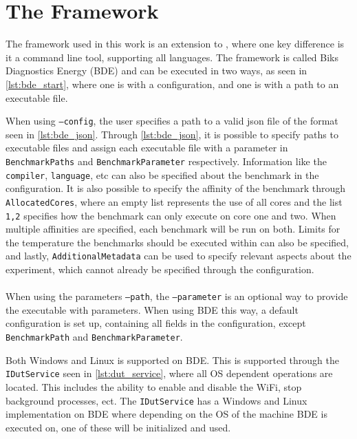 \section{The Framework}\label{app:framework}

The framework used in this work is an extension to \cite{biksbois}, where one key difference is it a command line tool, supporting all languages. The framework is called Biks Diagnostics Energy (BDE) and can be executed in two ways, as seen in \cref{lst:bde_start}, where one is with a configuration, and one is with a path to an executable file.



When using \texttt{--config}, the user specifies a path to a valid json file of the format seen in \cref{lst:bde_json}. Through \cref{lst:bde_json}, it is possible to specify paths to executable files and assign each executable file with a parameter in \texttt{BenchmarkPaths} and \texttt{BenchmarkParameter} respectively. Information like the \texttt{compiler}, \texttt{language}, etc can also be specified about the benchmark in the configuration. It is also possible to specify the affinity of the benchmark through \texttt{AllocatedCores}, where an empty list represents the use of all cores and the list \texttt{1,2} specifies how the benchmark can only execute on core one and two. When multiple affinities are specified, each benchmark will be run on both. Limits for the temperature the benchmarks should be executed within can also be specified, and lastly, \texttt{AdditionalMetadata} can be used to specify relevant aspects about the experiment, which cannot already be specified through the configuration.



\paragraph*{}
When using the parameters \texttt{--path}, the \texttt{--parameter} is an optional way to provide the executable with parameters. When using BDE this way, a default configuration is set up, containing all fields in the configuration, except \texttt{BenchmarkPath} and \texttt{BenchmarkParameter}.
\newpage



Both Windows and Linux is supported on BDE. This is supported through the \texttt{IDutService} seen in \cref{lst:dut_service}, where all OS dependent operations are located. This includes the ability to enable and disable the WiFi, stop background processes, ect. The \texttt{IDutService} has a Windows and Linux implementation on BDE where depending on the OS of the machine BDE is executed on, one of these will be initialized and used.


